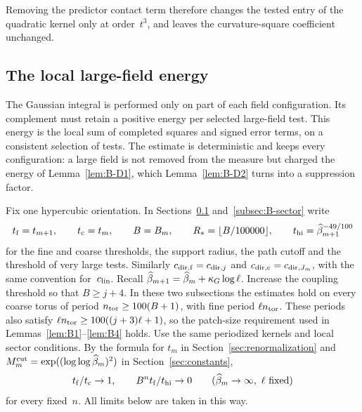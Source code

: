 Removing the predictor contact term therefore changes the tested entry of the quadratic kernel only at order~$t^3$, and leaves the curvature-square coefficient unchanged.

\subsection{The local large-field energy}\label{subsec:B-energy}

The Gaussian integral is performed only on part of each field configuration. Its complement must retain a positive energy per selected large-field test. This energy is the local sum of completed squares and signed error terms, on a consistent selection of tests. The estimate is deterministic and keeps every configuration: a large field is not removed from the measure but charged the energy of Lemma~\ref{lem:B-D1}, which Lemma~\ref{lem:B-D2} turns into a suppression factor.

Fix one hypercubic orientation. In Sections~\ref{subsec:B-energy} and~\ref{subsec:B-sector} write
\begin{equation*}
t_{\rm f}=t_{m+1},\qquad t_{\rm c}=t_m,\qquad B=B_m,\qquad R_*=\lfloor B/100000\rfloor,\qquad t_{\rm hi}=\widehat{\beta}_{m+1}^{-49/100}
\end{equation*}
for the fine and coarse thresholds, the support radius, the path cutoff and the threshold of very large tests. Similarly $c_{{\rm dir},{\rm f}}=c_{{\rm dir},j}$ and $c_{{\rm dir},{\rm c}}=c_{{\rm dir},J_m}$, with the same convention for~$c_{\rm lin}$. Recall $\widehat{\beta}_{m+1}=\widehat{\beta}_m+\kappa_G\log\ell$. Increase the coupling threshold so that $B\ge j+4$. In these two subsections the estimates hold on every coarse torus of period $n_{\rm tor}\ge100(B+1)$, with fine period $\ell n_{\rm tor}$. These periods also satisfy $\ell n_{\rm tor}\ge100((j+3)\ell+1)$, so the patch-size requirement used in Lemmas~\ref{lem:B1}--\ref{lem:B4} holds. Use the same periodized kernels and local sector conditions. By the formula for $t_m$ in Section~\ref{sec:renormalization} and $M^{\mathrm{cut}}_m=\exp((\log\log\widehat{\beta}_m)^2)$ in Section~\ref{sec:constants},
\begin{equation*}
t_{\rm f}/t_{\rm c}\to1,\qquad B^nt_{\rm f}/t_{\rm hi}\to0\qquad(\widehat{\beta}_m\to\infty,\ \ell\text{ fixed})
\end{equation*}
for every fixed~$n$. All limits below are taken in this way.

